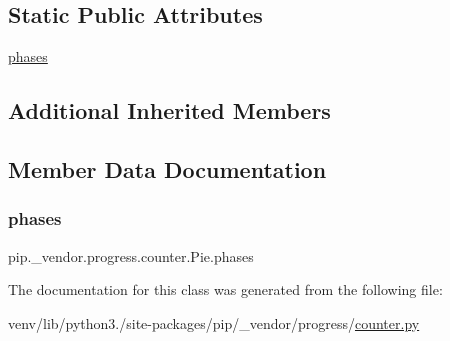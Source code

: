 \subsection*{Static Public Attributes}
\begin{DoxyCompactItemize}
\item 
\hyperlink{classpip_1_1__vendor_1_1progress_1_1counter_1_1Pie_a6093582e0429c8c7120d43f1291b70da}{phases}
\end{DoxyCompactItemize}
\subsection*{Additional Inherited Members}


\subsection{Member Data Documentation}
\mbox{\label{classpip_1_1__vendor_1_1progress_1_1counter_1_1Pie_a6093582e0429c8c7120d43f1291b70da}} 
\subsubsection{\texorpdfstring{phases}{phases}}
{\footnotesize\ttfamily pip.\+\_\+vendor.\+progress.\+counter.\+Pie.\+phases\hspace{0.3cm}{\ttfamily [static]}}



The documentation for this class was generated from the following file\+:\begin{DoxyCompactItemize}
\item 
venv/lib/python3./site-\/packages/pip/\+\_\+vendor/progress/\hyperlink{counter_8py}{counter.\+py}\end{DoxyCompactItemize}
